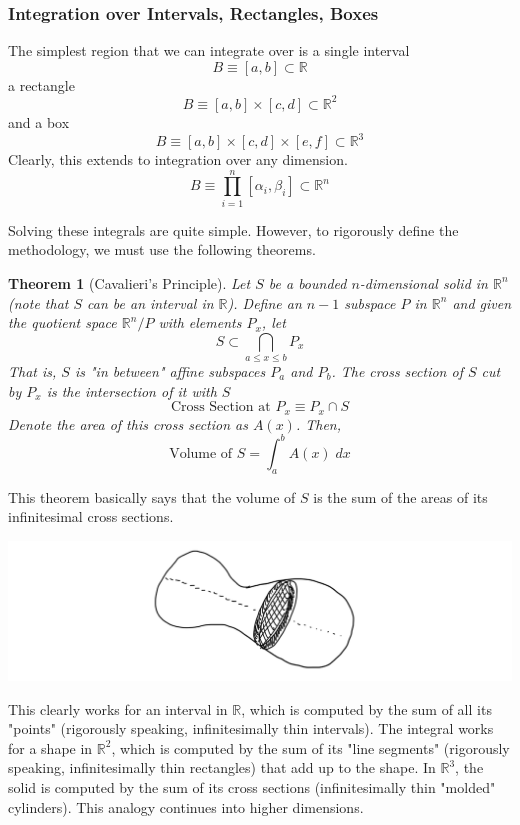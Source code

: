 \documentclass{article}
\newtheorem{theorem}{Theorem}[section]
\theoremstyle{remark}
\theoremstyle{definition}
\begin{document}
\subsubsection{Integration over Intervals, Rectangles, Boxes}
The simplest region that we can integrate over is a single interval 
\[B \equiv [a,b] \subset \mathbb{R}\]
a rectangle 
\[B \equiv [a, b] \times [c,d] \subset \mathbb{R}^2\]
and a box 
\[B \equiv [a,b] \times [c,d] \times [e,f] \subset \mathbb{R}^3\]
Clearly, this extends to integration over any dimension. 
\[B \equiv \prod_{i=1}^n [\alpha_i, \beta_i] \subset \mathbb{R}^n\]

Solving these integrals are quite simple. However, to rigorously define the methodology, we must use the following theorems. 

\begin{theorem}[Cavalieri's Principle]
Let $S$ be a bounded $n$-dimensional solid in $\mathbb{R}^n$ (note that $S$ can be an interval in $\mathbb{R}$). Define an $n-1$ subspace $P$ in $\mathbb{R}^n$ and given the quotient space $\mathbb{R}^n / P$ with elements $P_x$, let 
\[S \subset \bigcap_{a \leq x \leq b} P_x\]
That is, $S$ is "in between" affine subspaces $P_a$ and $P_b$. The cross section of $S$ cut by $P_x$ is the intersection of it with $S$
\[\text{Cross Section at } P_x \equiv P_x \cap S\]
Denote the area of this cross section as $A(x)$. Then, 
\[\text{Volume of } S = \int_a^b A(x) \; d x\]
\end{theorem}
This theorem basically says that the volume of $S$ is the sum of the areas of its infinitesimal cross sections. 
\begin{center}
    \includegraphics[scale=0.27]{img/Cavalieri_Principle .PNG}
\end{center}
This clearly works for an interval in $\mathbb{R}$, which is computed by the sum of all its "points" (rigorously speaking, infinitesimally thin intervals). The integral works for a shape in $\mathbb{R}^2$, which is computed by the sum of its "line segments" (rigorously speaking, infinitesimally thin rectangles) that add up to the shape. In $\mathbb{R}^3$, the solid is computed by the sum of its cross sections (infinitesimally thin "molded" cylinders). This analogy continues into higher dimensions. 
\end{document}

